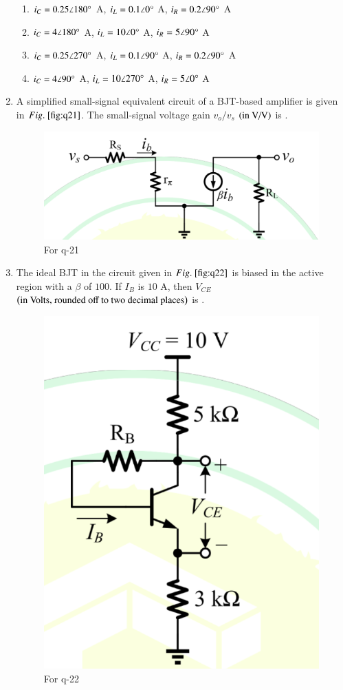 \documentclass[journal,12pt,onecolumn]{IEEEtran}
\theoremstyle{remark}
\begin{document}
\begin{enumerate}
\hfill{}

\begin{enumerate}
\item $i_C = 0.25\angle180\degree$ A, $i_L = 0.1\angle0\degree$ A, $i_R = 0.2\angle90\degree$ A
\item $i_C = 4\angle180\degree$ A, $i_L = 10\angle0\degree$ A, $i_R = 5\angle90\degree$ A
\item $i_C = 0.25\angle270\degree$ A, $i_L = 0.1\angle90\degree$ A, $i_R = 0.2\angle90\degree$ A
\item $i_C = 4\angle90\degree$ A, $i_L = 10\angle270\degree$ A, $i_R = 5\angle0\degree$ A
\end{enumerate}

\item A simplified small-signal equivalent circuit of a BJT-based amplifier is given in $\figref{fig:q21}$. The small-signal voltage gain $v_o/v_s$ $\left(\text{in V/V}\right)$ is \underline{\hspace{2cm}}.
\begin{figure}[H]
\centering
\includegraphics[width=0.5\columnwidth]{q21}
\caption{For q-21}
\label{fig:q21}
\end{figure}

\hfill{}

\begin{enumerate}
\end{enumerate}

\item The ideal BJT in the circuit given in $\figref{fig:q22}$ is biased in the active region with a $\beta$ of $100$. If $I_B$ is $10$ \textmu A, then $V_{CE}$ $\left(\text{in Volts, rounded off to two decimal places}\right)$ is \underline{\hspace{2cm}}.
\begin{figure}[H]
\centering
\includegraphics[width=0.3\columnwidth]{q22}
\caption{For q-22}
\label{fig:q22}
\end{figure}


\end{enumerate}
\end{document}
